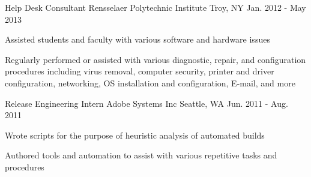 \begin{cventries}

\cventry
    {Help Desk Consultant} %
    {Rensselaer Polytechnic Institute} %
    {Troy, NY} %
    {Jan. 2012 - May 2013} %
    { %
        \begin{cvitems}
            \item{Assisted students and faculty with various software and hardware issues}
            \item{Regularly performed or assisted with various diagnostic, repair, and configuration procedures including virus removal, computer security, printer and driver configuration, networking, OS installation and configuration, E-mail, and more}
        \end{cvitems}
    }


\cventry
    {Release Engineering Intern} %
    {Adobe Systems Inc} %
    {Seattle, WA} %
    {Jun. 2011 - Aug. 2011} %
    { %
        \begin{cvitems}
            \item{Wrote scripts for the purpose of heuristic analysis of automated builds}
            \item{Authored tools and automation to assist with various repetitive tasks and procedures}
        \end{cvitems}
    }

\end{cventries}
